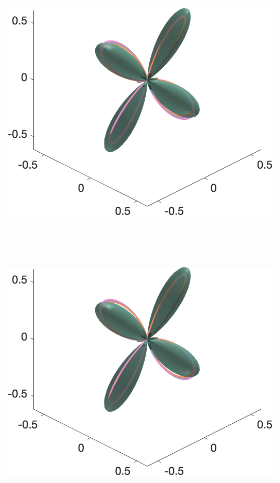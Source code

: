 \begin{figure}
  \begin{subfigure}[]{\textwidth}
  \begin{subfigure}[]{0.32\textwidth}
    \includegraphics[width=\textwidth]{figures/frf_experiment/twoperp_fod_3D_b_1000n_4}
  \end{subfigure}
  ~
  \begin{subfigure}[]{0.32\textwidth}
    \includegraphics[width=\textwidth]{figures/frf_experiment/twoperp_fod_3D_b_2000n_4}
  \end{subfigure}
  ~
  \begin{subfigure}[]{0.32\textwidth}

\end{subfigure}
\end{subfigure}
\end{figure}
